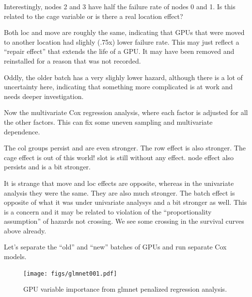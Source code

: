 Interestingly, nodes 2 and 3 have half the failure rate of nodes 0 and
1. Is this related to the cage variable or is there a real location
effect?

Both loc and move are roughly the same, indicating that GPUs that were
moved to another location had slighly (.75x) lower failure rate. This
may just reflect a “repair effect” that extends the life of a GPU. It
may have been removed and reinstalled for a reason that was not
recorded. 
 
Oddly, the older batch has a very slighly lower hazard, although there
is a lot of uncertainty here, indicating that something more
complicated is at work and needs deeper investigation. 

Now the multivariate Cox regression analysis, where each factor is
adjusted for all the other factors. This can fix some uneven sampling
and multivariate dependence. 

The col groups persist and are even stronger. The row effect is also
stronger. The cage effect is out of this world! slot is still without
any effect. node effect also persists and is a bit stronger. 

It is strange that move and loc effects are opposite, whereas in the
univariate analysis they were the same. They are also much
stronger. The batch effect is opposite of what it was under univariate
analysys and a bit stronger as well. This is a concern and it may be
related to violation of the “proportionality assumption” of hazards
not crossing. We see some crossing in the survival curves above
already. 

Let’s separate the “old” and “new” batches of GPUs and run separate
Cox models. 





\begin{figure}
  \texttt{[image: figs/glmnet001.pdf]}
  \caption{GPU variable importance from glmnet penalized regression analysis.}
\end{figure}
